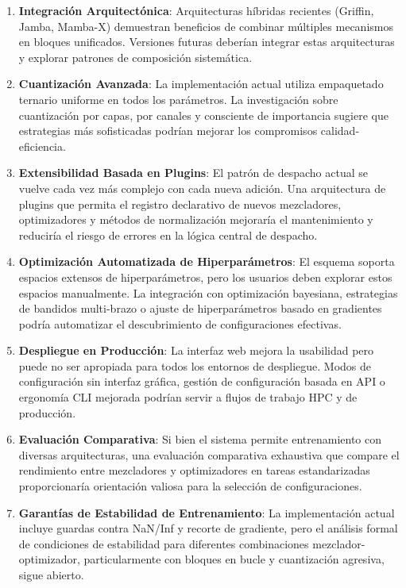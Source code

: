 \begin{enumerate}[leftmargin=*]
    \item \textbf{Integración Arquitectónica}: Arquitecturas híbridas recientes (Griffin, Jamba, Mamba-X) demuestran beneficios de combinar múltiples mecanismos en bloques unificados. Versiones futuras deberían integrar estas arquitecturas y explorar patrones de composición sistemática.
    
    \item \textbf{Cuantización Avanzada}: La implementación actual utiliza empaquetado ternario uniforme en todos los parámetros. La investigación sobre cuantización por capas, por canales y consciente de importancia sugiere que estrategias más sofisticadas podrían mejorar los compromisos calidad-eficiencia.
    
    \item \textbf{Extensibilidad Basada en Plugins}: El patrón de despacho actual se vuelve cada vez más complejo con cada nueva adición. Una arquitectura de plugins que permita el registro declarativo de nuevos mezcladores, optimizadores y métodos de normalización mejoraría el mantenimiento y reduciría el riesgo de errores en la lógica central de despacho.
    
    \item \textbf{Optimización Automatizada de Hiperparámetros}: El esquema soporta espacios extensos de hiperparámetros, pero los usuarios deben explorar estos espacios manualmente. La integración con optimización bayesiana, estrategias de bandidos multi-brazo o ajuste de hiperparámetros basado en gradientes podría automatizar el descubrimiento de configuraciones efectivas.
    
    \item \textbf{Despliegue en Producción}: La interfaz web mejora la usabilidad pero puede no ser apropiada para todos los entornos de despliegue. Modos de configuración sin interfaz gráfica, gestión de configuración basada en API o ergonomía CLI mejorada podrían servir a flujos de trabajo HPC y de producción.
    
    \item \textbf{Evaluación Comparativa}: Si bien el sistema permite entrenamiento con diversas arquitecturas, una evaluación comparativa exhaustiva que compare el rendimiento entre mezcladores y optimizadores en tareas estandarizadas proporcionaría orientación valiosa para la selección de configuraciones.
    
    \item \textbf{Garantías de Estabilidad de Entrenamiento}: La implementación actual incluye guardas contra NaN/Inf y recorte de gradiente, pero el análisis formal de condiciones de estabilidad para diferentes combinaciones mezclador-optimizador, particularmente con bloques en bucle y cuantización agresiva, sigue abierto.
    

\end{enumerate}
